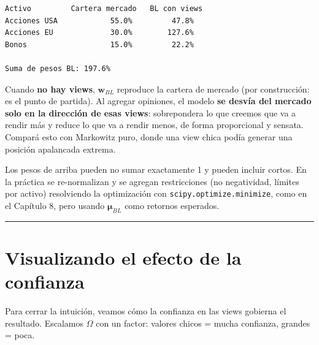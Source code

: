 \documentclass[
  spanish,
  letterpaper,
  DIV=11,
  numbers=noendperiod]{scrreprt}
\begin{document}
\begin{verbatim}
Activo         Cartera mercado   BL con views
Acciones USA            55.0%         47.8%
Acciones EU             30.0%        127.6%
Bonos                   15.0%         22.2%

Suma de pesos BL: 197.6%
\end{verbatim}

Cuando \textbf{no hay views}, \(\mathbf{w}_{BL}\) reproduce la cartera
de mercado (por construcción: es el punto de partida). Al agregar
opiniones, el modelo \textbf{se desvía del mercado solo en la dirección
de esas views}: sobrepondera lo que creemos que va a rendir más y reduce
lo que va a rendir menos, de forma proporcional y sensata. Compará esto
con Markowitz puro, donde una view chica podía generar una posición
apalancada extrema.

\begin{tcolorbox}[enhanced jigsaw, bottomrule=.15mm, colback=white, opacitybacktitle=0.6, arc=.35mm, toprule=.15mm, opacityback=0, breakable, titlerule=0mm, left=2mm, coltitle=black, colbacktitle=quarto-callout-warning-color!10!white, colframe=quarto-callout-warning-color-frame, leftrule=.75mm, toptitle=1mm, bottomtitle=1mm, title=\textcolor{quarto-callout-warning-color}{\faExclamationTriangle}\hspace{0.5em}{Detalle práctico}, rightrule=.15mm]

Los pesos de arriba pueden no sumar exactamente 1 y pueden incluir
cortos. En la práctica se re-normalizan y se agregan restricciones (no
negatividad, límites por activo) resolviendo la optimización con
\texttt{scipy.optimize.minimize}, como en el Capítulo 8, pero usando
\(\boldsymbol{\mu}_{BL}\) como retornos esperados.

\end{tcolorbox}

\begin{center}\rule{0.5\linewidth}{0.5pt}\end{center}

\chapter{Visualizando el efecto de la
confianza}\label{visualizando-el-efecto-de-la-confianza}

Para cerrar la intuición, veamos cómo la confianza en las views gobierna
el resultado. Escalamos \(\Omega\) con un factor: valores chicos = mucha
confianza, grandes = poca.
\end{document}
